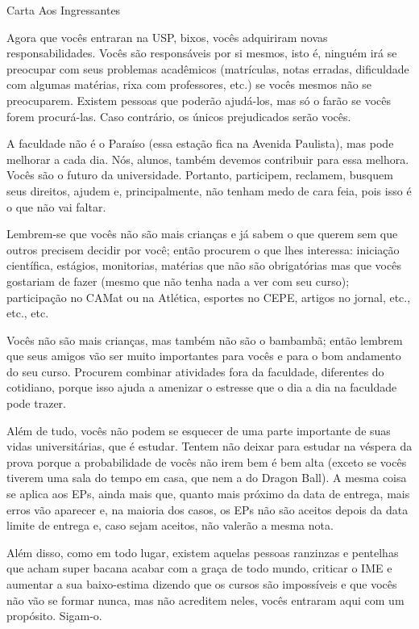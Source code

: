\begin{secao}{Carta Aos Ingressantes}

Agora que vocês entraran na USP, bixos, vocês adquiriram novas
responsabilidades.  Vocês são responsáveis por si mesmos, isto é, ninguém irá se
preocupar com seus problemas acadêmicos (matrículas, notas erradas, dificuldade
com algumas matérias, rixa com professores, etc.) se vocês mesmos não se
preocuparem. Existem pessoas que poderão ajudá-los, mas só o farão se vocês
forem procurá-las. Caso contrário, os únicos prejudicados serão vocês.

A faculdade não é o Paraíso (essa estação fica na Avenida Paulista), mas pode
melhorar a cada dia. Nós, alunos, também devemos contribuir para essa melhora.
Vocês são o futuro da universidade. Portanto, participem, reclamem, busquem seus
direitos, ajudem e, principalmente, não tenham medo de cara feia, pois isso é o
que não vai faltar.

Lembrem-se que vocês não são mais crianças e já sabem o que querem sem que
outros precisem decidir por você; então procurem o que lhes interessa: iniciação
científica, estágios, monitorias, matérias que não são obrigatórias mas que
vocês gostariam de fazer (mesmo que não tenha nada a ver com seu curso);
participação no CAMat ou na Atlética, esportes no CEPE, artigos no jornal, etc.,
etc., etc.

Vocês não são mais crianças, mas também não são o bambambã; então lembrem que
seus amigos vão ser muito importantes para vocês e para o bom andamento do seu
curso. Procurem combinar atividades fora da faculdade, diferentes do cotidiano,
porque isso ajuda a amenizar o estresse que o dia a dia na faculdade pode
trazer.

Além de tudo, vocês não podem se esquecer de uma parte importante de suas vidas
universitárias, que é estudar. Tentem não deixar para estudar na véspera da
prova porque a probabilidade de vocês não irem bem é bem alta (exceto se vocês
tiverem uma sala do tempo em casa, que nem a do Dragon Ball). A mesma coisa se
aplica aos EPs, ainda mais que, quanto mais próximo da data de entrega, mais
erros vão aparecer e, na maioria dos casos, os EPs não são aceitos depois da
data limite de entrega e, caso sejam aceitos, não valerão a mesma nota.

Além disso, como em todo lugar, existem aquelas pessoas ranzinzas e pentelhas
que acham super bacana acabar com a graça de todo mundo, criticar o IME e
aumentar a sua baixo-estima dizendo que os cursos são impossíveis e que vocês
não vão se formar nunca, mas não acreditem neles, vocês entraram aqui com um
propósito. Sigam-o.


\end{secao}

